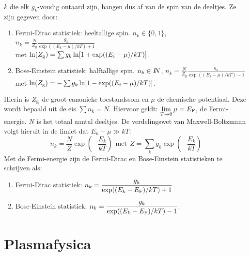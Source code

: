 $k$ die elk $g_k$-voudig ontaard zijn, hangen dus af van de spin van de
deeltjes. Ze zijn gegeven door:
\begin{enumerate}
\item Fermi-Dirac statistiek: heeltallige spin. $n_k\in\{0,1\}$,
      $\displaystyle n_k=\frac{N}{Z_g}\frac{g_k}{\exp((E_k-\mu)/kT)+1}$\\
      met $\ln(Z_{\rm g})=\sum g_k\ln[1+\exp((E_i-\mu)/kT)]$.
\item Bose-Einstein statistiek: halftallige spin. $n_k\in I\hspace{-1mm}N$,
      $\displaystyle n_k=\frac{N}{Z_g}\frac{g_k}{\exp((E_k-\mu)/kT)-1}$\\
      met $\ln(Z_{\rm g})=-\sum g_k\ln[1-\exp((E_i-\mu)/kT)]$.
\end{enumerate}
Hierin is $Z_{\rm g}$ de groot-canonieke toestandssom en $\mu$ de chemische
potentiaal. Deze wordt bepaald uit de eis $\sum n_k=N$. Hiervoor geldt:
$\displaystyle\lim\limits_{T\rightarrow0}\mu=E_{\rm F}$, de Fermi-energie.
$N$ is het totaal aantal deeltjes. De verdelingswet van Maxwell-Boltzmann
volgt hieruit in de limiet dat $E_k-\mu\gg kT$:
\[
n_k=\frac{N}{Z}\exp\left(-\frac{E_k}{kT}\right)~~\mbox{met}~~
Z=\sum_kg_k\exp\left(-\frac{E_k}{kT}\right)
\]
Met de Fermi-energie zijn de Fermi-Dirac en Bose-Einstein statistieken te
schrijven als:
\begin{enumerate}
\item Fermi-Dirac statistiek: $\displaystyle n_k=\frac{g_k}{\exp((E_k-E_{\rm F})/kT)+1}$.
\item Bose-Einstein statistiek: $\displaystyle n_k=\frac{g_k}{\exp((E_k-E_{\rm F})/kT)-1}$.
\end{enumerate}

\chapter{Plasmafysica}
